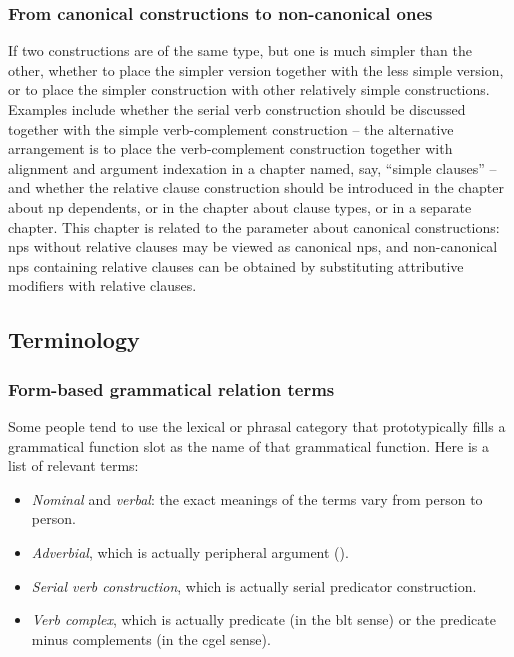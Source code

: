 \documentclass[UTF8, a4paper, oneside, scheme=plain]{ctexart}
\newcommand*{\term}[1]{\emph{#1}}
\begin{document}
\subsubsection{From canonical constructions to non-canonical ones}

If two constructions are of the same type,
but one is much simpler than the other,
whether to place the simpler version together with the less simple version,
or to place the simpler construction with other relatively simple constructions.
Examples include whether the serial verb construction should be discussed 
together with the simple verb-complement construction 
-- the alternative arrangement is to place the verb-complement construction 
together with alignment and argument indexation in a chapter named, say, ``simple clauses'' -- 
and whether the relative clause construction 
should be introduced in the chapter about \ac{np} dependents,
or in the chapter about clause types,
or in a separate chapter.
This chapter is related to the parameter about canonical constructions:
\ac{np}s without relative clauses may be viewed as canonical \ac{np}s,
and non-canonical \ac{np}s containing relative clauses 
can be obtained by substituting attributive modifiers with relative clauses.


\subsection{Terminology}

\subsubsection{Form-based grammatical relation terms}\label{sec:form-based-function-name}

Some people tend to use the lexical or phrasal category 
that prototypically fills a grammatical function slot 
as the name of that grammatical function.
Here is a list of relevant terms:
\begin{itemize}
    \item \term{Nominal} and \term{verbal}: the exact meanings of the terms vary from person to person.
    \item \term{Adverbial}, which is actually peripheral argument ().
    \item \term{Serial verb construction}, which is actually serial predicator construction.
    \item \term{Verb complex}, which is actually predicate (in the \ac{blt} sense) 
    or the predicate minus complements (in the \ac{cgel} sense).
\end{itemize}
\end{document}
